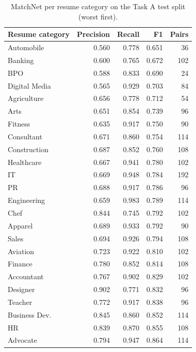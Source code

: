 \begin{table}[H]
\centering\footnotesize
\begin{tabularx}{\linewidth}{@{}L r r r r@{}}
\toprule
Resume category & Precision & Recall & F1 & Pairs\\
\midrule
Automobile & 0.560 & 0.778 & 0.651 & 36\\
Banking & 0.600 & 0.765 & 0.672 & 102\\
BPO & 0.588 & 0.833 & 0.690 & 24\\
Digital Media & 0.565 & 0.929 & 0.703 & 84\\
Agriculture & 0.656 & 0.778 & 0.712 & 54\\
Arts & 0.651 & 0.854 & 0.739 & 96\\
Fitness & 0.635 & 0.917 & 0.750 & 90\\
Consultant & 0.671 & 0.860 & 0.754 & 114\\
Construction & 0.687 & 0.852 & 0.760 & 108\\
Healthcare & 0.667 & 0.941 & 0.780 & 102\\
IT & 0.669 & 0.948 & 0.784 & 192\\
PR & 0.688 & 0.917 & 0.786 & 96\\
Engineering & 0.659 & 0.983 & 0.789 & 114\\
Chef & 0.844 & 0.745 & 0.792 & 102\\
Apparel & 0.689 & 0.933 & 0.792 & 90\\
Sales & 0.694 & 0.926 & 0.794 & 108\\
Aviation & 0.723 & 0.922 & 0.810 & 102\\
Finance & 0.780 & 0.852 & 0.814 & 108\\
Accountant & 0.767 & 0.902 & 0.829 & 102\\
Designer & 0.902 & 0.771 & 0.832 & 96\\
Teacher & 0.772 & 0.917 & 0.838 & 96\\
Business Dev. & 0.845 & 0.860 & 0.852 & 114\\
HR & 0.839 & 0.870 & 0.855 & 108\\
Advocate & 0.794 & 0.947 & 0.864 & 114\\
\bottomrule
\end{tabularx}
\caption{MatchNet per resume category on the Task A test split (worst first).}\label{tab:errcat}
\end{table}
